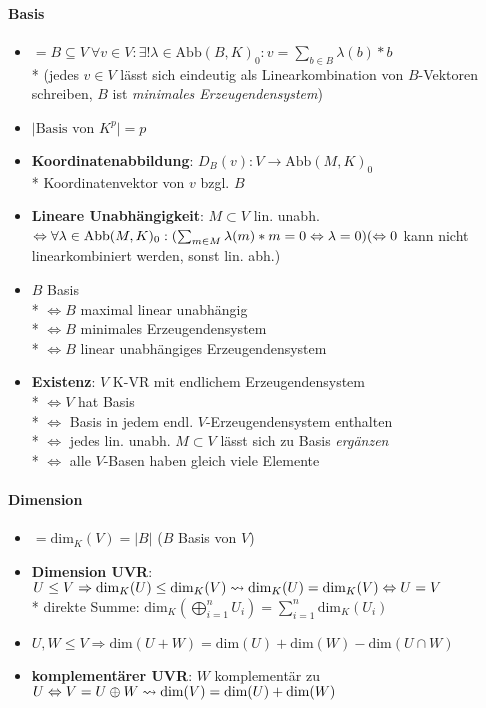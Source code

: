 \paragraph{Basis}
\begin{itemize}
	\item $=B \subseteq V \ \forall v \in V: \exists ! \lambda \in \text{Abb}(B,K)_0:  v=\sum_{b \in B} \lambda(b)*b$ \\* (jedes $v \in V$ lässt sich eindeutig als Linearkombination von $B$-Vektoren schreiben, $B$ ist \emph{minimales Erzeugendensystem})
	\item $\mid \text{Basis von } K^p \mid = p$
	\item \textbf{Koordinatenabbildung}: $D_B(v): V \rightarrow \text{Abb}(M,K)_0$ \\* Koordinatenvektor von $v$ bzgl. $B$
	\item \textbf{Lineare Unabhängigkeit}: $M \subset V$ lin. unabh. $\\* \Leftrightarrow \forall \lambda \in \text{Abb}(M,K)_0: (\sum_{m \in M} \lambda(m)*m=0 \Leftrightarrow \lambda = 0) \\* (\Leftrightarrow 0$ kann nicht linearkombiniert werden, sonst lin. abh.)
	\item $B$ Basis \\* $\Leftrightarrow B$ maximal linear unabhängig \\* $\Leftrightarrow B$ minimales Erzeugendensystem \\* $\Leftrightarrow B$ linear unabhängiges Erzeugendensystem
	\item \textbf{Existenz}: $V$ K-VR mit endlichem Erzeugendensystem \\* $\Leftrightarrow V$ hat Basis \\* $\Leftrightarrow$ Basis in jedem endl. $V$-Erzeugendensystem enthalten \\* $\Leftrightarrow$ jedes lin. unabh. $M \subset V$ lässt sich zu Basis \emph{ergänzen} \\* $\Leftrightarrow$ alle $V$-Basen haben gleich viele Elemente
\end{itemize}

\paragraph{Dimension}
\begin{itemize}
	\item $=\text{dim}_K(V)=|B|$ ($B$ Basis von $V$)
	\item \textbf{Dimension UVR}: $U \leq V \Rightarrow \text{dim}_K(U) \leq \text{dim}_K(V) \\* \leadsto \text{dim}_K(U)=\text{dim}_K(V) \Leftrightarrow U=V$ \\* direkte Summe: $\text{dim}_K(\bigoplus_{i=1}^n U_i) = \sum_{i=1}^n \text{dim}_K(U_i)$
	\item $U,W \leq V \Rightarrow \text{dim}(U+W)=\text{dim}(U)+\text{dim}(W)-\text{dim}(U\cap W)$
	\item \textbf{komplementärer UVR}: $W$ komplementär zu $U \Leftrightarrow V=U \oplus W \\* \leadsto \text{dim}(V)=\text{dim}(U)+\text{dim}(W)$
\end{itemize}

